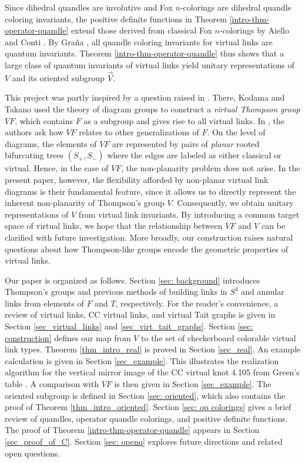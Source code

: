 \documentclass[11pt, twoside]{amsart}
\numberwithin{equation}{section}
\theoremstyle{definition}
\numberwithin{equation}{section}
\begin{document}
Since dihedral quandles are involutive and Fox $n$-colorings are dihedral quandle coloring invariants, the positive definite functions in Theorem \ref{intro-thm-operator-quandle} extend those derived from classical Fox $n$-colorings by Aiello and Conti \cite{AC19}. By Gra\~{n}a \cite{grana}, all quandle coloring invariants for virtual links are quantum invariants. Theorem \ref{intro-thm-operator-quandle} thus shows that a large class of quantum invariants of virtual links yield unitary representations of $V$ and its oriented subgroup $\vec{V}$.

This project was partly inspired by a question raised in \cite{KTVF}. There, Kodama and Takano used the theory of diagram groups to construct a \textit{virtual Thompson group} $\mathit{VF}$, which contains $F$ as a subgroup and gives rise to all virtual links. In \cite{KTVF}, the authors ask how $\mathit{VF}$ relates to other generalizations of $F$. On the level of diagrams, the elements of $\mathit{VF}$ are represented by pairs of \emph{planar} rooted bifurcating trees $(S_+,S_-)$ where the edges are labeled as either classical or virtual. Hence, in the case of $\mathit{VF}$, the non-planarity problem does not arise. In the present paper, however, the flexibility afforded by non-planar virtual link diagrams is their fundamental feature, since it allows us to directly represent the inherent non-planarity of Thompson's group $V$. Consequently, we obtain unitary representations of $V$ from virtual link invariants. By introducing a common target space of virtual links, we hope that the relationship between $\mathit{VF}$ and $V$ can be clarified with future investigation. More broadly, our construction raises natural questions about how Thompson-like groups encode the geometric properties of virtual links.

Our paper is organized as follows. Section \ref{sec: background} introduces Thompson's groups and previous methods of building links in $S^3$ and annular links from elements of $F$ and $T$, respectively. For the reader's convenience, a review of virtual links, CC virtual links, and virtual Tait graphs is given in Section \ref{sec_virtual_links} and \ref{sec_virt_tait_graphs}. Section \ref{sec: construction} defines our map from $V$ to the set of checkerboard colorable virtual link types. Theorem \ref{thm_intro_real} is proved in Section \ref{sec_real}. An example calculation is given in Section \ref{sec_example}. This illustrates the realization algorithm for the vertical mirror image of the CC virtual knot 4.105 from Green's table \cite{green}. A comparison with $\mathit{VF}$ is then given in Section \ref{sec_example}. The oriented subgroup is defined in Section \ref{sec: oriented}, which also contains the proof of Theorem \ref{thm_intro_oriented}. Section \ref{sec: op colorings} gives a brief review of quandles, operator quandle colorings, and positive definite functions. The proof of Theorem \ref{intro-thm-operator-quandle} appears in Section \ref{sec_proof_of_C}. Section \ref{sec: openq} explores future directions and related open questions. 
\end{document}
